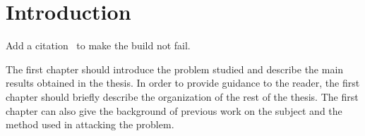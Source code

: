 
\chapter{Introduction}
Add a citation~\cite{IEEEexample:urlsty} to make the build not fail.

The first chapter should introduce the problem studied and describe the main results obtained in the thesis.
In order to provide guidance to the reader, the first chapter should briefly describe the organization of the rest of the thesis.
The first chapter can also give the background of previous work on the subject and the method used in attacking the problem.